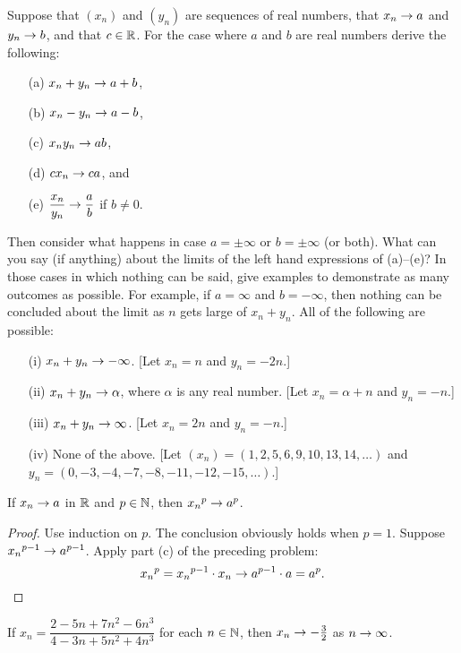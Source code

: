 \begin{prob}\label{seq_proj} Suppose that $(x_n)$ and $(y_n)$ are sequences of real numbers,
that $x_n \rightarrow a$ and $y_n \rightarrow b$, and that $c \in \mathbb{R}$.  For the case where $a$ and $b$ are
real numbers derive the following:
 \begin{enumerate}
  \item[(a)] $x_n + y_n \rightarrow a + b$,
  \item[(b)] $x_n - y_n \rightarrow a - b$,
  \item[(c)] $x_n y_n \rightarrow ab$,
  \item[(d)] $c x_n \rightarrow ca$, and
  \item[(e)] $\dfrac{x_n}{y_n} \rightarrow \dfrac ab$ if $b \ne 0$.
 \end{enumerate}
Then consider what happens in case $a = \pm\infty$ or $b = \pm\infty$ (or both).  What can you
say (if anything) about the limits of the left hand expressions of (a)--(e)?  In those cases
in which nothing can be said, give examples to demonstrate as many outcomes as possible.  For
example, if $a = \infty$ and $b = -\infty$, then nothing can be concluded about the limit as
$n$ gets large of $x_n+y_n$.  All of the following are possible:
 \begin{enumerate}
  \item[(i)] $x_n + y_n \rightarrow -\infty$. [Let $x_n = n$ and $y_n = -2n$.]
  \item[(ii)] $x_n + y_n \rightarrow \alpha$, where $\alpha$ is any real number. [Let $x_n = \alpha + n$
and $y_n = -n$.]
  \item[(iii)] $x_n + y_n \rightarrow \infty$. [Let $x_n = 2n$ and $y_n = -n$.]
  \item[(iv)] None of the above. [Let $(x_n) = (1,2,5,6,9,10,13,14,\dots)$ and
$y_n = (0,-3,-4,-7,-8,-11,-12,-15,\dots)$.]
\end{enumerate}
\end{prob}

\begin{exam} If $x_n \rightarrow a$ in $\mathbb{R}$ and $p \in  \mathbb{N}$, then ${x_n}^p \rightarrow a^p$.
\end{exam}

\begin{proof} Use induction on $p$.  The conclusion obviously holds when $p=1$.  Suppose
${x_n}^{p-1} \rightarrow a^{p-1}$.  Apply part (c) of the preceding problem:
   \[{x_n}^p = {x_n}^{p-1} \cdot x_n \rightarrow a^{p-1} \cdot a = a^p.\]
\end{proof}

\begin{exam} If $x_n = \dfrac{2-5n+7n^2-6n^3}{4-3n+5n^2+4n^3}$ for each $n \in \mathbb{N}$, then
$x_n \rightarrow -\frac32$ as $n \rightarrow \infty$.
\end{exam}

